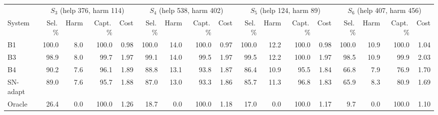 \begin{tabular}{@{}lrrrrrrrrrrrrrrrr@{}}\toprule
 & \multicolumn{4}{c}{$S_3$ \scriptsize(help 376, harm 114)} & \multicolumn{4}{c}{$S_4$ \scriptsize(help 538, harm 402)} & \multicolumn{4}{c}{$S_5$ \scriptsize(help 124, harm 89)} & \multicolumn{4}{c}{$S_6$ \scriptsize(help 407, harm 456)}\\\cmidrule(lr){2-5}\cmidrule(lr){6-9}\cmidrule(lr){10-13}\cmidrule(lr){14-17}
System & Sel.\,\% & Harm & Capt.\,\% & Cost & Sel.\,\% & Harm & Capt.\,\% & Cost & Sel.\,\% & Harm & Capt.\,\% & Cost & Sel.\,\% & Harm & Capt.\,\% & Cost\\\midrule
B1 & 100.0 & 8.0 & 100.0 & 0.98 & 100.0 & 14.0 & 100.0 & 0.97 & 100.0 & 12.2 & 100.0 & 0.98 & 100.0 & 10.9 & 100.0 & 1.04\\
B3 & 98.9 & 8.0 & 99.7 & 1.97 & 99.1 & 14.0 & 99.5 & 1.97 & 99.5 & 12.2 & 100.0 & 1.97 & 98.5 & 10.9 & 99.9 & 2.03\\
B4 & 90.2 & 7.6 & 96.1 & 1.89 & 88.8 & 13.1 & 93.8 & 1.87 & 86.4 & 10.9 & 95.5 & 1.84 & 66.8 & 7.9 & 76.9 & 1.70\\
SN-adapt & 89.0 & 7.6 & 95.7 & 1.88 & 87.0 & 13.0 & 93.3 & 1.86 & 85.7 & 11.3 & 96.8 & 1.83 & 65.9 & 8.3 & 80.9 & 1.69\\
Oracle & 26.4 & 0.0 & 100.0 & 1.26 & 18.7 & 0.0 & 100.0 & 1.18 & 17.0 & 0.0 & 100.0 & 1.17 & 9.7 & 0.0 & 100.0 & 1.10\\
\bottomrule\end{tabular}
